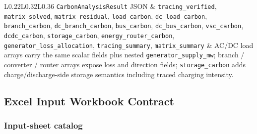 \begin{longtable}{L{0.22\linewidth}L{0.32\linewidth}L{0.36\linewidth}}
\texttt{CarbonAnalysisResult} JSON & \texttt{tracing\_verified}, \texttt{matrix\_solved}, \texttt{matrix\_residual}, \texttt{load\_carbon}, \texttt{dc\_load\_carbon}, \texttt{branch\_carbon}, \texttt{dc\_branch\_carbon}, \texttt{bus\_carbon}, \texttt{dc\_bus\_carbon}, \texttt{vsc\_carbon}, \texttt{dcdc\_carbon}, \texttt{storage\_carbon}, \texttt{energy\_router\_carbon}, \texttt{generator\_loss\_allocation}, \texttt{tracing\_summary}, \texttt{matrix\_summary} & AC/DC load arrays carry the same scalar fields plus nested \texttt{generator\_supply\_mw}; branch / converter / router arrays expose loss and direction fields; \texttt{storage\_carbon} adds charge/discharge-side storage semantics including traced charging intensity. \\
\bottomrule
\end{longtable}

\subsection{Excel Input Workbook Contract}

\subsubsection*{Input-sheet catalog}

